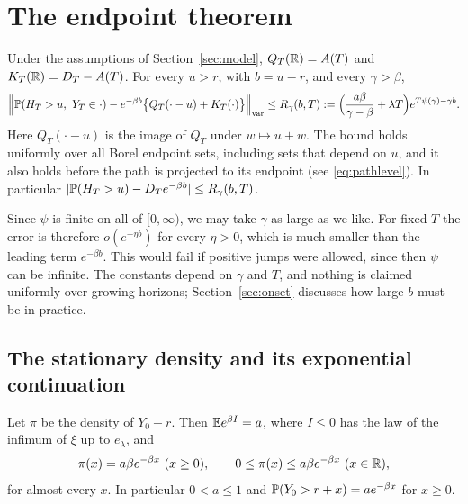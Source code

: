 \documentclass[11pt,a4paper]{article}
\begin{document}
\section{The endpoint theorem}\label{sec:thm1}

\begin{theorem}\label{thm:endpoint}
Under the assumptions of Section~\ref{sec:model}, $Q_T(\mathbb R)=A(T)$ and $K_T(\mathbb R)=D_T-A(T)$. For every $u>r$, with $b=u-r$, and every $\gamma>\beta$,
\begin{equation}\label{eq:main}
 \Big\|\mathbb P(H_T>u,\ Y_T\in\cdot)-e^{-\beta b}\big\{Q_T(\cdot-u)+K_T(\cdot)\big\}\Big\|_{\mathrm{var}}
 \le R_\gamma(b,T):=\Big(\frac{a\beta}{\gamma-\beta}+\lambda T\Big)e^{T\psi(\gamma)-\gamma b}.
\end{equation}
Here $Q_T(\cdot-u)$ is the image of $Q_T$ under $w\mapsto u+w$. The bound holds uniformly over all Borel endpoint sets, including sets that depend on $u$, and it also holds before the path is projected to its endpoint (see \eqref{eq:pathlevel}). In particular $|\mathbb P(H_T>u)-D_Te^{-\beta b}|\le R_\gamma(b,T)$.
\end{theorem}

Since $\psi$ is finite on all of $[0,\infty)$, we may take $\gamma$ as large as we like. For fixed $T$ the error is therefore $o(e^{-\eta b})$ for every $\eta>0$, which is much smaller than the leading term $e^{-\beta b}$. This would fail if positive jumps were allowed, since then $\psi$ can be infinite. The constants depend on $\gamma$ and $T$, and nothing is claimed uniformly over growing horizons; Section~\ref{sec:onset} discusses how large $b$ must be in practice.

\subsection{The stationary density and its exponential continuation}

\begin{lemma}\label{lem:pi}
Let $\pi$ be the density of $Y_0-r$. Then $\mathbb E e^{\beta I}=a$, where $I\le0$ has the law of the infimum of $\xi$ up to $e_\lambda$, and
\begin{equation}\label{eq:pi}
 \pi(x)=a\beta e^{-\beta x}\ (x\ge0),\qquad 0\le\pi(x)\le a\beta e^{-\beta x}\ (x\in\mathbb R),
\end{equation}
for almost every $x$. In particular $0<a\le1$ and $\mathbb P(Y_0>r+x)=a e^{-\beta x}$ for $x\ge0$.
\end{lemma}
\end{document}
